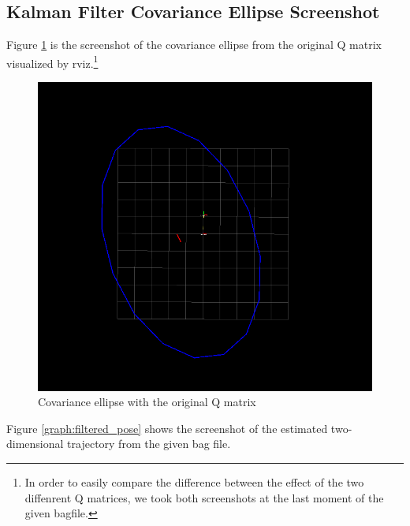\documentclass[14pt,a4paper]{article}
\begin{document}
\section{}
	\subsection{Kalman Filter Covariance Ellipse Screenshot}
		Figure \ref{graph:Q_origin} is the screenshot of the covariance ellipse from the original Q matrix visualized by rviz.\footnote{In order to easily compare the difference between the effect of the two diffenrent Q matrices, we took both screenshots at the last moment of the given bagfile.}\\
	
	\begin{figure}[htbp]
	\centering
	\includegraphics[scale=0.5]{Q_origin.png}
  	\caption{Covariance ellipse with the original Q matrix}
    \label{graph:Q_origin}
	\end{figure}
	
	Figure \ref{graph:filtered_pose} shows the screenshot of the estimated two-dimensional trajectory from the given bag file.
	
\end{document}

